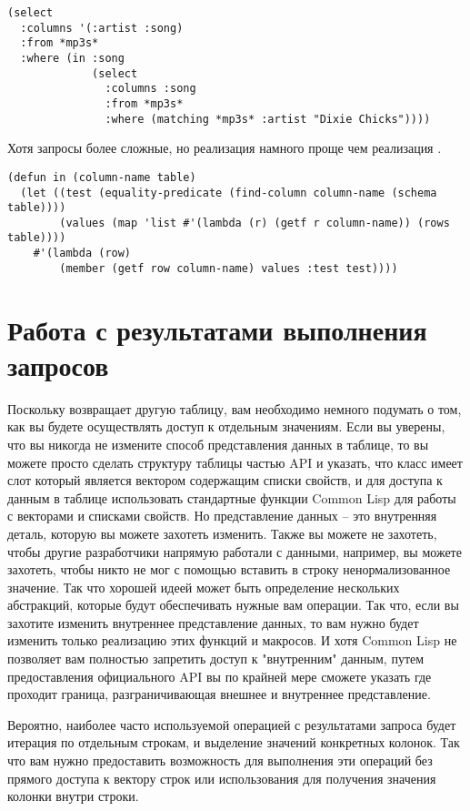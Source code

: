 \begin{lstlisting}
(select
  :columns '(:artist :song)
  :from *mp3s*
  :where (in :song 
             (select
               :columns :song
               :from *mp3s*
               :where (matching *mp3s* :artist "Dixie Chicks"))))
\end{lstlisting}

Хотя запросы более сложные, но реализация  намного проще чем реализация
.

\begin{lstlisting}
(defun in (column-name table)
  (let ((test (equality-predicate (find-column column-name (schema table))))
        (values (map 'list #'(lambda (r) (getf r column-name)) (rows table))))
    #'(lambda (row)
        (member (getf row column-name) values :test test))))
\end{lstlisting}

\section{Работа с результатами выполнения запросов}

Поскольку  возвращает другую таблицу, вам необходимо немного подумать о том,
как вы будете осуществлять доступ к отдельным значениям.  Если вы уверены, что вы никогда
не измените способ представления данных в таблице, то вы можете просто сделать структуру
таблицы частью API и указать, что класс  имеет слот  который
является вектором содержащим списки свойств, и для доступа к данным в таблице использовать
стандартные функции Common Lisp для работы с векторами и списками свойств.  Но
представление данных -- это внутренняя деталь, которую вы можете захотеть изменить.  Также
вы можете не захотеть, чтобы другие разработчики напрямую работали с данными, например, вы
можете захотеть, чтобы никто не мог с помощью  вставить в строку
ненормализованное значение.  Так что хорошей идеей может быть определение нескольких
абстракций, которые будут обеспечивать нужные вам операции.  Так что, если вы захотите
изменить внутреннее представление данных, то вам нужно будет изменить только реализацию
этих функций и макросов.  И хотя Common Lisp не позволяет вам полностью запретить доступ к
"внутренним" данным, путем предоставления официального API вы по крайней мере сможете
указать где проходит граница, разграничивающая внешнее и внутреннее представление.

Вероятно, наиболее часто используемой операцией с результатами запроса будет итерация по
отдельным строкам, и выделение значений конкретных колонок.  Так что вам нужно
предоставить возможность для выполнения эти операций без прямого доступа к вектору строк
или использования  для получения значения колонки внутри строки.

